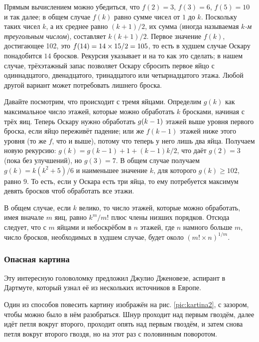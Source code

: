 Прямым вычислением можно убедиться, что $f(2) = 3$, $f(3) = 6$, $f(5) = 10$ и так далее; в общем случае $f(k)$ равно сумме чисел от $1$ до $k$.
Поскольку таких чисел $k$, а их среднее равно $(k + 1)/2$, их сумма (иногда называемая \emph{$k$-м треугольным числом}), составляет $k(k + 1)/2$.
Первое значение $f(k)$, достигающее 102, это $f(14) \z= 14 \times 15/2 \z= 105$, то есть в худшем случае Оскару понадобится $14$ бросков.
Рекурсия указывает и на то как это сделать;
в нашем случае, трёхэтажный запас позволяет Оскару сбросить первое яйцо с одиннадцатого, двенадцатого, тринадцатого или четырнадцатого этажа.
Любой другой вариант может потребовать лишнего броска.

Давайте посмотрим, что происходит с тремя яйцами.
Определим $g(k)$ как максимальное число этажей, которые можно обработать $k$ бросками, начиная с трёх яиц.
Теперь Оскару нужно обработать $g(k \z- 1)$ этажей выше уровня первого броска, если яйцо переживёт падение;
или же $f(k - 1)$ этажей ниже этого уровня (то же $f$, что и выше), потому что теперь у него лишь два яйца.
Получаем новую рекурсию: $g(k) = g(k-1) + 1 + (k - 1)k/2$, что даёт $g(2) = 3$ (пока без улучшений), но $g(3) = 7$.
В общем случае получаем $g(k)=k(k^2+5)/6$ и наименьшее значение $k$, для которого 
$g(k)\ge 102$, равно $9$.
То есть, если у Оскара есть три яйца,
то ему потребуется максимум девять бросков чтоб обработать все этажи.

В общем случае, если $k$ велико, то число этажей, которые можно обработать, имея вначале $m$ яиц, равно $k^m/m!$ плюс члены низших порядков.
Отсюда следует, что с $m$ яйцами и небоскрёбом в $n$ этажей, где  $n$ намного больше $m$, число бросков, необходимых в худшем случае, будет около $(m!\times n)^{1/m}$.

\subsubsection*{Опасная картина}

Эту интересную головоломку предложил Джулио Дженовезе, аспирант в Дартмуте, который узнал её из нескольких источников в Европе.

Один из способов повесить картину изображён на рис. \ref{pic:kartina2}, с зазором, чтобы можно было в нём разобраться.
Шнур проходит над первым гвоздём,
далее идёт петля вокруг второго,
проходит опять над первым гвоздём, и затем снова петля вокруг второго гвоздя, но на этот раз с половинным поворотом.

